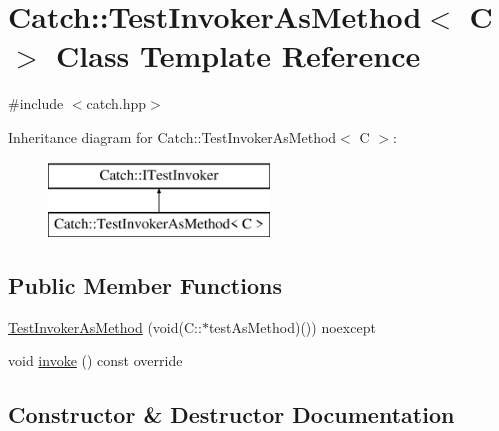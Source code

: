 \hypertarget{class_catch_1_1_test_invoker_as_method}{}\section{Catch\+:\+:Test\+Invoker\+As\+Method$<$ C $>$ Class Template Reference}
\label{class_catch_1_1_test_invoker_as_method}


{\ttfamily \#include $<$catch.\+hpp$>$}

Inheritance diagram for Catch\+:\+:Test\+Invoker\+As\+Method$<$ C $>$\+:\begin{figure}[H]
\begin{center}
\leavevmode
\includegraphics[height=2.000000cm]{class_catch_1_1_test_invoker_as_method}
\end{center}
\end{figure}
\subsection*{Public Member Functions}
\begin{DoxyCompactItemize}
\item 
\mbox{\hyperlink{class_catch_1_1_test_invoker_as_method_a119c4bdbbdd95c42859c18541987a1a4}{Test\+Invoker\+As\+Method}} (void(C\+::$\ast$test\+As\+Method)()) noexcept
\item 
void \mbox{\hyperlink{class_catch_1_1_test_invoker_as_method_a8115a06efe273f4112ec0b5452c1b5f2}{invoke}} () const override
\end{DoxyCompactItemize}


\subsection{Constructor \& Destructor Documentation}
\mbox{\label{class_catch_1_1_test_invoker_as_method_a119c4bdbbdd95c42859c18541987a1a4}} 
